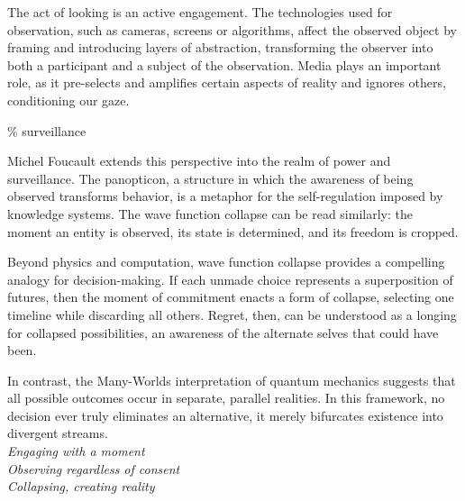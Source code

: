 The act of looking is an active engagement. The technologies used for observation, such as cameras, screens or algorithms, affect the observed object by framing and introducing layers of abstraction, transforming the observer into both a participant and a subject of the observation. Media plays an important role, as it pre-selects and amplifies certain aspects of reality and ignores others, conditioning our gaze.

{\scriptsize \textcolor{comment}{\%  surveillance }}

Michel Foucault extends this perspective into the realm of power and surveillance. The panopticon, a structure in which the awareness of being observed transforms behavior, is a metaphor for the self-regulation imposed by knowledge systems. \citep{foucault1975} The wave function collapse can be read similarly: the moment an entity is observed, its state is determined, and its freedom is cropped. 

Beyond physics and computation, wave function collapse provides a compelling analogy for decision-making. If each unmade choice represents a superposition of futures, then the moment of commitment enacts a form of collapse, selecting one timeline while discarding all others. Regret, then, can be understood as a longing for collapsed possibilities, an awareness of the alternate selves that could have been.

In contrast, the Many-Worlds interpretation of quantum mechanics suggests that all possible outcomes occur in separate, parallel realities. In this framework, no decision ever truly eliminates an alternative, it merely bifurcates existence into divergent streams.
\\
 
\textit{Engaging with a moment\\Observing regardless of consent\\Collapsing, creating reality}

